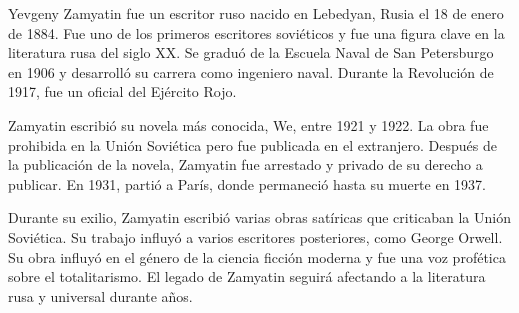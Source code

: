 

Yevgeny Zamyatin fue un escritor ruso nacido en Lebedyan, Rusia el 18 de enero de 1884. Fue uno de los primeros escritores soviéticos y fue una figura clave en la literatura rusa del siglo XX. Se graduó de la Escuela Naval de San Petersburgo en 1906 y desarrolló su carrera como ingeniero naval. Durante la Revolución de 1917, fue un oficial del Ejército Rojo.

Zamyatin escribió su novela más conocida, We, entre 1921 y 1922. La obra fue prohibida en la Unión Soviética pero fue publicada en el extranjero. Después de la publicación de la novela, Zamyatin fue arrestado y privado de su derecho a publicar. En 1931, partió a París, donde permaneció hasta su muerte en 1937.

Durante su exilio, Zamyatin escribió varias obras satíricas que criticaban la Unión Soviética. Su trabajo influyó a varios escritores posteriores, como George Orwell. Su obra influyó en el género de la ciencia ficción moderna y fue una voz profética sobre el totalitarismo. El legado de Zamyatin seguirá afectando a la literatura rusa y universal durante años.